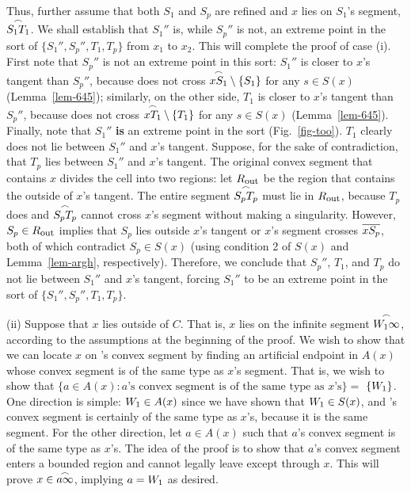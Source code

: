 Thus, further assume that both $S_{1}$ and $S_{p}$ are refined
and $x$ lies on $S_{1}$'s segment, $\mbox{$\stackrel{\frown}{S_{1}T_{1}}$}$.
We shall establish that $S_{1}''$ is, while $S_{p}''$ is not, an extreme 
point
in the sort of $\{S_{1}'',S_{p}'',T_{1},T_{p}\}$ from $x_{1}$ to $x_{2}$.
This will complete the proof of case (i).
First note that $S_{p}''$ is not an extreme point in this sort:
$S_{1}''$ is closer to $x$'s tangent than $S_{p}''$,
because  does not cross $\mbox{$\stackrel{\frown}{xS_{1}}$} \setminus \{S_{1}\}$ 
for any $s \in S(x)$ (Lemma~\ref{lem-645});
similarly, on the other side, $T_{1}$ is closer to $x$'s tangent 
than $S_{p}''$,
because  does not cross $\mbox{$\stackrel{\frown}{xT_{1}}$} \setminus \{T_{1}\}$ 
for any $s \in S(x)$ (Lemma~\ref{lem-645}).
Finally, note that $S_{1}''$ {\bf is} an extreme point in the 
sort (Fig.~\ref{fig-too}).
$T_{1}$ clearly does not lie between $S_{1}''$ and $x$'s tangent.
Suppose, for the sake of contradiction, that $T_{p}$ lies between 
$S_{1}''$ and $x$'s 
tangent.
The original convex segment that contains $x$ divides the cell into two 
regions:
let $R_{\mbox{\footnotesize{out}}}$ be the region that contains the 
outside of $x$'s tangent.
The entire segment $\mbox{$\stackrel{\frown}{S_{p}T_{p}}$}$ must lie in 
$R_{\mbox{\footnotesize{out}}}$, because
$T_{p}$ does and $\mbox{$\stackrel{\frown}{S_{p}T_{p}}$}$ cannot cross
$x$'s segment without making a singularity.
However, $S_{p} \in R_{\mbox{\footnotesize{out}}}$ implies that $S_{p}$ 
lies outside $x$'s 
tangent
or $x$'s segment crosses $\mbox{$\overline{xS_{p}}$}$, both of which 
contradict $S_{p} \in S(x)$
(using condition 2 of $S(x)$ and Lemma~\ref{lem-argh}, respectively).
Therefore,
we conclude that $S_{p}''$, $T_{1}$, and $T_{p}$ do not 
lie between $S_{1}''$ and $x$'s tangent,
forcing $S_{1}''$ to be an extreme point in the sort of 
$\{S_{1}'',S_{p}'',T_{1},T_{p}\}$.



(ii) Suppose that $x$ lies outside of $C$.
That is, $x$ lies on the infinite segment $\mbox{$\stackrel{\frown}{\mbox{$W_{1}$}\infty}$}$,
according to the assumptions at the beginning of the proof.
We wish to show that we can locate $x$ on \wo's convex segment
by finding an artificial endpoint
in $A(x)$ whose convex segment is of the same type as $x$'s segment.
That is, we wish to show that
\mbox{$\{a \in A(x): \mbox{$a$'s convex segment is of the same type 
as $x$'s}\} =$}
$\{\mbox{$W_{1}$}\}$.
One direction is simple: $\mbox{$W_{1}$} \in A(x)$ since we have shown 
that $\mbox{$W_{1}$} \in S(x)$,
and \wo's convex segment is certainly of the same type as $x$'s, because 
it is the same
segment.
For the other direction, let $a \in A(x)$ such that $a$'s convex segment 
is of the same type as $x$'s.
The idea of the proof is to show that $a$'s convex segment
enters a bounded region and cannot legally leave except through $x$.
This will prove $x \in \mbox{$\stackrel{\frown}{a\infty}$}$, implying $a = \mbox{$W_{1}$}$ as desired.

